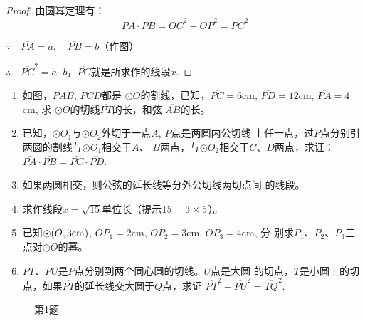 \begin{proof}
    由圆幂定理有：
\[    \overline{PA}\cdot \overline{PB}=\overline{OC}^2-\overline{OP}^2=\overline{PC}^2\]

$\because\quad \overline{PA}=a,\quad \overline{PB}=b$（作图）

$\therefore\quad \overline{PC}^2=a\cdot b$，$\overline{PC}$就是所求作的线段$x$.
\end{proof}

\begin{ex}
\begin{enumerate}
  \item 如图，$PAB$, $PCD$都是
$\odot O$的割线，已知，$\overline{PC}=6$cm, 
  $\overline{PD}=12$cm, $\overline{PA}=4$cm, 求
  $\odot O$的切线$\overline{PT}$的长，和弦
  $\overline{AB}$的长。
  \item 已知，$\odot O_1$与$\odot O_2$外切于一点$A$, $P$点是两圆内公切线
  上任一点，过$P$点分别引两圆的割线与$\odot O_1$相交于$A$、
  $B$两点，与$\odot O_2$相交于$C$、$D$两点，求证：$\overline{PA}\cdot \overline{PB}=
  \overline{PC}\cdot\overline{PD}$.
  \item 如果两圆相交，则公弦的延长线等分外公切线两切点间
  的线段。
  \item 求作线段$x=\sqrt{15}$单位长（提示$15=3\times5$）。
  \item 已知$\odot (O,3{\rm cm})$, $\overline{OP_1}=2$cm, $\overline{OP_2}=3$cm, $\overline{OP_3}=4$cm, 分
  别求$P_1$、$P_2$、$P_3$三点对$\odot O$的幂。
  \item $PT$、$PU$是$P$点分别到两个同心圆的切线。$U$点是大圆
  的切点，$T$是小圆上的切点，如果$\overline{PT}$的延长线交大圆于$Q$点，求证
  $\overline{PT}^2-\overline{PU}^2=\overline{TQ}^2$.
\end{enumerate}
\end{ex}

\begin{figure}[htp]
  \centering
  \caption*{第1题}
\end{figure}
    
